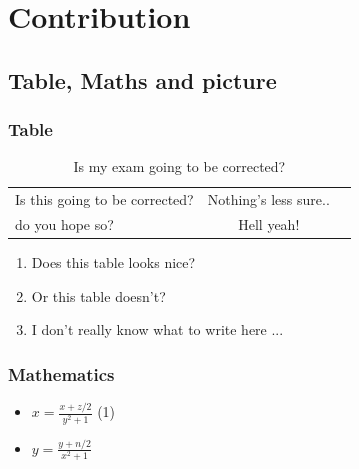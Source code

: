 \documentclass[12pt]{report}
\begin{document}
			
			
\chapter{Contribution}
	\section{Table, Maths and picture}
		\subsection{Table}
		
		\begin{table}[!h] \label{sec:table}
		\begin{center}
			\begin{tabular}{|l||c|r} 
				Is this going to be corrected? & Nothing's less sure..\\
				do you hope so? & Hell yeah!\\
			\end{tabular}
			\caption{Is my exam going to be corrected?}
		\end{center}
		\end{table}
		
		\begin{enumerate}
			\item Does this table looks nice?
			\item Or this table doesn't?
			\item I don't really know what to write here ... 
		\end{enumerate}
		
		
		\subsection{Mathematics}
			\begin{itemize}
			 	\large \item \(x= \frac{x+z/2}{y ^{2}+1}\)		(1) \label{sec:math} 
			 	\item \(y= \frac{y+n/2}{x ^{2}+1}\) 
			\end{itemize}
			
		
		\newpage
\end{document}
